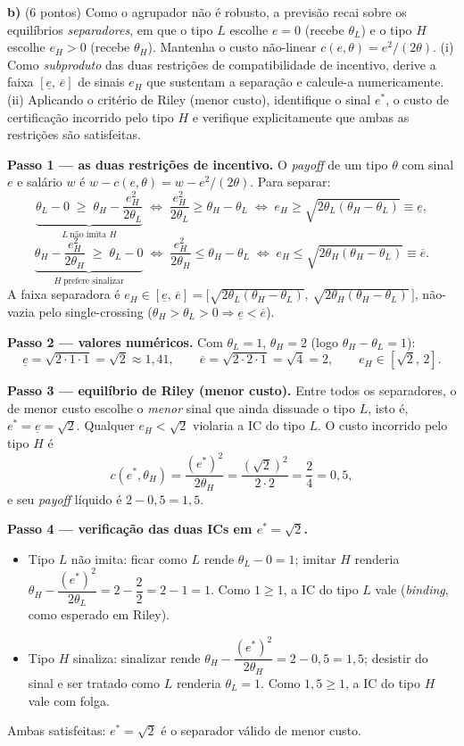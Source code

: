 \textbf{b)} (6 pontos) Como o agrupador n\~ao \'e robusto, a previs\~ao recai sobre os equil\'ibrios \emph{separadores}, em que o tipo $L$ escolhe $e=0$ (recebe $\theta_L$) e o tipo $H$ escolhe $e_H>0$ (recebe $\theta_H$). Mantenha o custo n\~ao-linear $c(e,\theta)=e^{2}/(2\theta)$. (i) Como \emph{subproduto} das duas restri\c{c}\~oes de compatibilidade de incentivo, derive a faixa $[\underline e,\,\overline e]$ de sinais $e_H$ que sustentam a separa\c{c}\~ao e calcule-a numericamente. (ii) Aplicando o crit\'erio de Riley (menor custo), identifique o sinal $e^{*}$, o custo de certifica\c{c}\~ao incorrido pelo tipo $H$ e verifique explicitamente que ambas as restri\c{c}\~oes s\~ao satisfeitas.
\resolucaobox{5.5cm}
\begin{solucao}
\textbf{Passo 1 --- as duas restri\c{c}\~oes de incentivo.} O \emph{payoff} de um tipo $\theta$ com sinal $e$ e sal\'ario $w$ \'e $w-c(e,\theta)=w-e^{2}/(2\theta)$. Para separar:
\[
\underbrace{\theta_L-0\;\ge\;\theta_H-\frac{e_H^{2}}{2\theta_L}}_{L\ \text{n\~ao imita }H}
\;\Longleftrightarrow\;
\frac{e_H^{2}}{2\theta_L}\ge\theta_H-\theta_L
\;\Longleftrightarrow\;
e_H\ge\sqrt{2\theta_L(\theta_H-\theta_L)}\equiv\underline e,
\]
\[
\underbrace{\theta_H-\frac{e_H^{2}}{2\theta_H}\;\ge\;\theta_L-0}_{H\ \text{prefere sinalizar}}
\;\Longleftrightarrow\;
\frac{e_H^{2}}{2\theta_H}\le\theta_H-\theta_L
\;\Longleftrightarrow\;
e_H\le\sqrt{2\theta_H(\theta_H-\theta_L)}\equiv\overline e.
\]
A faixa separadora \'e $e_H\in[\underline e,\,\overline e]=\big[\sqrt{2\theta_L(\theta_H-\theta_L)},\,\sqrt{2\theta_H(\theta_H-\theta_L)}\,\big]$, n\~ao-vazia pelo single-crossing ($\theta_H>\theta_L>0\Rightarrow\underline e<\overline e$).

\textbf{Passo 2 --- valores num\'ericos.} Com $\theta_L=1$, $\theta_H=2$ (logo $\theta_H-\theta_L=1$):
\[
\underline e=\sqrt{2\cdot 1\cdot 1}=\sqrt{2}\approx 1{,}41,\qquad \overline e=\sqrt{2\cdot 2\cdot 1}=\sqrt{4}=2,\qquad e_H\in[\sqrt{2},\,2].
\]

\textbf{Passo 3 --- equil\'ibrio de Riley (menor custo).} Entre todos os separadores, o de menor custo escolhe o \emph{menor} sinal que ainda dissuade o tipo $L$, isto \'e, $e^{*}=\underline e=\sqrt{2}$. Qualquer $e_H<\sqrt{2}$ violaria a IC do tipo $L$. O custo incorrido pelo tipo $H$ \'e
\[
c(e^{*},\theta_H)=\frac{(e^{*})^{2}}{2\theta_H}=\frac{(\sqrt{2})^{2}}{2\cdot 2}=\frac{2}{4}=0{,}5,
\]
e seu \emph{payoff} l\'iquido \'e $2-0{,}5=1{,}5$.

\textbf{Passo 4 --- verifica\c{c}\~ao das duas ICs em $e^{*}=\sqrt{2}$.}
\begin{itemize}
\item Tipo $L$ n\~ao imita: ficar como $L$ rende $\theta_L-0=1$; imitar $H$ renderia $\theta_H-\dfrac{(e^{*})^{2}}{2\theta_L}=2-\dfrac{2}{2}=2-1=1$. Como $1\ge 1$, a IC do tipo $L$ vale (\emph{binding}, como esperado em Riley).
\item Tipo $H$ sinaliza: sinalizar rende $\theta_H-\dfrac{(e^{*})^{2}}{2\theta_H}=2-0{,}5=1{,}5$; desistir do sinal e ser tratado como $L$ renderia $\theta_L=1$. Como $1{,}5\ge 1$, a IC do tipo $H$ vale com folga.
\end{itemize}
Ambas satisfeitas: $e^{*}=\sqrt{2}$ \'e o separador v\'alido de menor custo.


\end{solucao}
